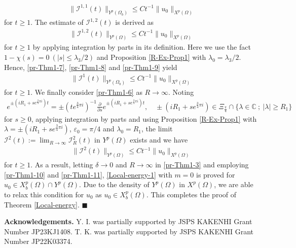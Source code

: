 \documentclass[dvipdfmx,12pt]{article}
\begin{document}
\begin{align}\label{pr-Thm1-8}
\|\mathcal{I}^{1,1 }(t)\|_{Y^p(\Omega_b)}\le Ct^{-1}\|u_0\|_{X^p(\Omega)}
\end{align}
for $t\ge1$. The estimate of $\mathcal{I}^{1,2 }(t)$ is derived as
\begin{align}\label{pr-Thm1-9}
\|\mathcal{I}^{1,2 }(t)\|_{Y^p(\Omega)}\le Ct^{-1}\|u_0\|_{X^p(\Omega)}
\end{align}
for $t\ge 1$ by applying integration by parts in its definition. Here we use the fact $1-\chi(s)=0~(|s|\le \lambda_3/2)$ and  Proposition \ref{R-Ex-Prop1} with $\lambda_0=\lambda_3/2$. Hence, \eqref{pr-Thm1-7}, \eqref{pr-Thm1-8} and \eqref{pr-Thm1-9} yield
\begin{align}\label{pr-Thm1-10}
\|\mathcal{I}^{1}(t)\|_{Y^p(\Omega_b)}\le Ct^{-1}\|u_0\|_{X^p(\Omega)}
\end{align}
for $t\ge 1$. We finally consider \eqref{pr-Thm1-6} as $R\to\infty$. Noting 
\begin{gather*}
e^{\pm(iR_1+s e^{\frac{3}{4}\pi i}) t}=\pm(te^{\frac{3}{4}\pi i})^{-1}\frac{\partial}{\partial s}e^{\pm(iR_1+s e^{\frac{3}{4}\pi i}) t},\quad 
\pm(iR_1+s e^{\frac{3}{4}\pi i})\in \Xi_{\frac{\pi}{4}}\cap \{\lambda\in\mathbb{C}~;~|\lambda|\ge R_1\}
\end{gather*}
for $s\ge0$, applying integration by parts and using Proposition \ref{R-Ex-Prop1} with $\lambda=\pm(iR_1+s e^{\frac{3}{4}\pi i})$, $\varepsilon_0=\pi/4$ and $\lambda_0=R_1$, the limit $\mathcal{I}^{2}(t):=\lim_{R\to\infty}\mathcal{I}_R^{2}(t)$ in $Y^p(\Omega)$ exists and we have
\begin{align}\label{pr-Thm1-11}
\|\mathcal{I}^{2}(t)\|_{Y^p(\Omega)}\le Ct^{-1}\|u_0\|_{X^p(\Omega)}
\end{align}
for $t\ge 1$. As a result, letting $\delta\to0$ and $R\to\infty$ in \eqref{pr-Thm1-3} and employing \eqref{pr-Thm1-10} and \eqref{pr-Thm1-11}, \eqref{Local-energy-1} with $m=0$ is proved for $u_0\in X_b^p(\Omega)\cap Y^p(\Omega)$. Due to the density of $Y^p(\Omega)$ in $X^p(\Omega)$, we are able to relax this condition for $u_0$ as $u_0\in X_b^p(\Omega)$. This completes the proof of Theorem \ref{Local-energy}. $\blacksquare$

\vskip1mm

\noindent
\textbf{Acknowledgements.}  
Y. I. was partially supported by JSPS KAKENHI Grant Number JP23KJ1408. T. K. was partially supported by JSPS KAKENHI Grant Number JP22K03374. \\[-6ex]
\end{document}
